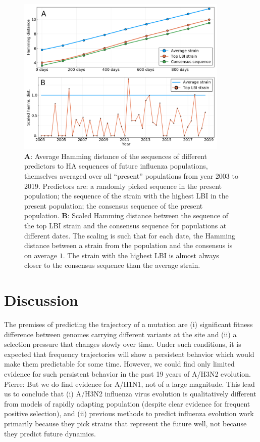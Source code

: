\documentclass[reprint,amsmath,amssymb,superscriptaddress,showpacs,pre]{revtex4-1}
\newcommand{\pierre}[1]{{\color{red}Pierre: #1}}
\begin{document}
\begin{figure}
	\centering
	\includegraphics[width=0.9\textwidth]{./Figures/Panel4.png}
	\caption{\textbf{A}: Average Hamming distance of the sequences of different predictors to HA sequences of future influenza populations, themselves averaged over all ``present'' populations from year 2003 to 2019. Predictors are: a randomly picked sequence in the present population; the sequence of the strain with the highest LBI in the present population; the consensus sequence of the present population. \textbf{B}: Scaled Hamming distance between the sequence of the top LBI strain and the consensus sequence for populations at different dates. The scaling is such that for each date, the Hamming distance between a strain from the population and the consensus is on average $1$. The strain with the highest LBI is almost always closer to the consensus sequence than the average strain.}
	\label{fig:LBI_consensus}
\end{figure}


\section*{Discussion} %
\label{sec:discussion}

The premises of predicting the trajectory of a mutation are (i) significant fitness difference between genomes carrying different variants at the site and (ii) a selection pressure that changes slowly over time. 
Under such conditions, it is expected that frequency trajectories will show a persistent behavior which would make them predictable for some time. 
However, we could find only limited evidence for such persistent behavior in the past 19 years of A/H3N2 evolution. \pierre{But we do find evidence for A/H1N1, not of a large magnitude.}
This lead us to conclude that (i) A/H3N2 influenza virus evolution is qualitatively different from models of rapidly adapting population (despite clear evidence for frequent positive selection), and (ii) previous methods to predict influenza evolution work primarily because they pick strains that represent the future well, not because they predict future dynamics. 
\end{document}
